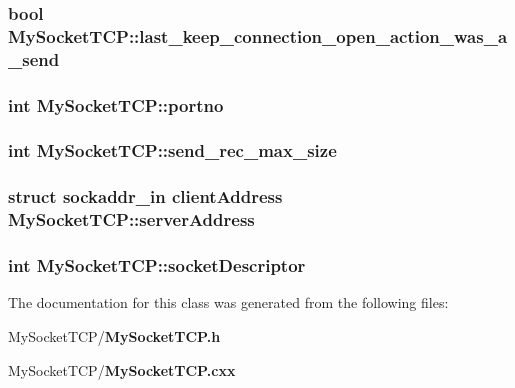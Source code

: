\subsubsection{\setlength{\rightskip}{0pt plus 5cm}bool \bf{My\-Socket\-TCP::last\_\-keep\_\-connection\_\-open\_\-action\_\-was\_\-a\_\-send}\hspace{0.3cm}{\tt  [private]}}\label{classMySocketTCP_e0cdfa6a0f0498c01d057ff5db10dca5}


\subsubsection{\setlength{\rightskip}{0pt plus 5cm}int \bf{My\-Socket\-TCP::portno}\hspace{0.3cm}{\tt  [private]}}\label{classMySocketTCP_cc9182c599b55d4f081c31cb162d56f6}


\subsubsection{\setlength{\rightskip}{0pt plus 5cm}int \bf{My\-Socket\-TCP::send\_\-rec\_\-max\_\-size}\hspace{0.3cm}{\tt  [private]}}\label{classMySocketTCP_702056a78e403d4931181d54e7263290}


\subsubsection{\setlength{\rightskip}{0pt plus 5cm}struct sockaddr\_\-in client\-Address \bf{My\-Socket\-TCP::server\-Address}\hspace{0.3cm}{\tt  [private]}}\label{classMySocketTCP_02c455c28f7aff0075c954c43715dad2}


\subsubsection{\setlength{\rightskip}{0pt plus 5cm}int \bf{My\-Socket\-TCP::socket\-Descriptor}\hspace{0.3cm}{\tt  [private]}}\label{classMySocketTCP_7246bd46ad899956f39109e528da0567}




The documentation for this class was generated from the following files:\begin{CompactItemize}
\item 
My\-Socket\-TCP/\bf{My\-Socket\-TCP.h}\item 
My\-Socket\-TCP/\bf{My\-Socket\-TCP.cxx}\end{CompactItemize}
